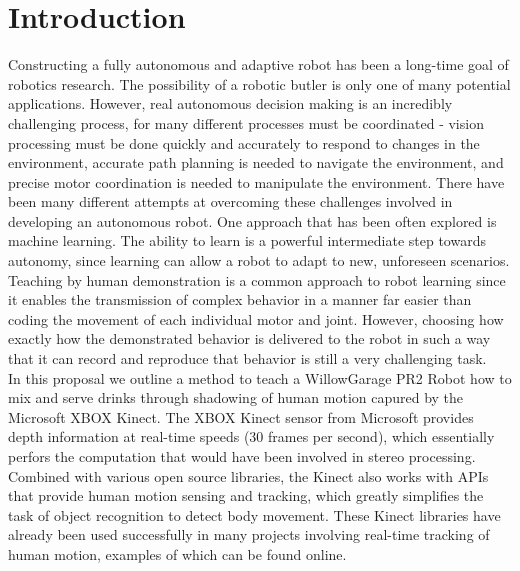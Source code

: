 \documentclass{sig-alternate}
\begin{document}
\section{Introduction}
\label{sec:intro}
Constructing a fully autonomous and adaptive robot has been a long-time goal of robotics research. The possibility of a robotic butler is only one of many potential applications. However, real autonomous decision making is an incredibly challenging process, for many different processes must be coordinated - vision processing must be done quickly and accurately to respond to changes in the environment, accurate path planning is needed to navigate the environment, and precise motor coordination is needed to manipulate the environment. There have been many different attempts at overcoming these challenges involved in developing an autonomous robot. One approach that has been often explored is machine learning. The ability to learn is a powerful intermediate step towards autonomy, since learning can allow a robot to adapt to new, unforeseen scenarios. Teaching by human demonstration is a common approach to robot learning since it enables the transmission of complex behavior in a manner far easier than coding the movement of each individual motor and joint. However, choosing how exactly how the demonstrated behavior is delivered to the robot in such a way that it can record and reproduce that behavior is still a very challenging task.\\ 

In this proposal we outline a method to teach a WillowGarage PR2 Robot how to mix and serve drinks through shadowing of human motion capured by the Microsoft XBOX Kinect. The XBOX Kinect sensor from Microsoft provides depth information at real-time speeds (30 frames per second), which essentially perfors the computation that would have been involved in stereo processing. Combined with various open source libraries\cite{kinect}, the Kinect also works with APIs that provide human motion sensing and tracking, which greatly simplifies the task of object recognition to detect body movement. These Kinect libraries have already been used successfully in many projects involving real-time tracking of human motion, examples of which can be found online\cite{freenect}.\\
\end{document}
